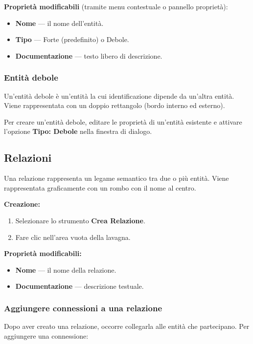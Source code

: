 \documentclass[a4paper,11pt]{article}
\newcommand{\uielement}[1]{\textbf{#1}}
\begin{document}
\textbf{Proprietà modificabili} (tramite menu contestuale o pannello proprietà):
\begin{itemize}
  \item \textbf{Nome} --- il nome dell'entità.
  \item \textbf{Tipo} --- Forte (predefinito) o Debole.
  \item \textbf{Documentazione} --- testo libero di descrizione.
\end{itemize}

\subsubsection{Entità debole}

Un'entità debole è un'entità la cui identificazione dipende da un'altra entità. Viene
rappresentata con un doppio rettangolo (bordo interno ed esterno).

Per creare un'entità debole, editare le proprietà di un'entità esistente e attivare l'opzione
\uielement{Tipo: Debole} nella finestra di dialogo.

\subsection{Relazioni}

Una relazione rappresenta un legame semantico tra due o più entità. Viene rappresentata
graficamente con un rombo con il nome al centro.

\textbf{Creazione:}
\begin{enumerate}
  \item Selezionare lo strumento \uielement{Crea Relazione}.
  \item Fare clic nell'area vuota della lavagna.
\end{enumerate}

\textbf{Proprietà modificabili:}
\begin{itemize}
  \item \textbf{Nome} --- il nome della relazione.
  \item \textbf{Documentazione} --- descrizione testuale.
\end{itemize}

\subsubsection{Aggiungere connessioni a una relazione}

Dopo aver creato una relazione, occorre collegarla alle entità che partecipano. Per aggiungere
una connessione:
\end{document}
